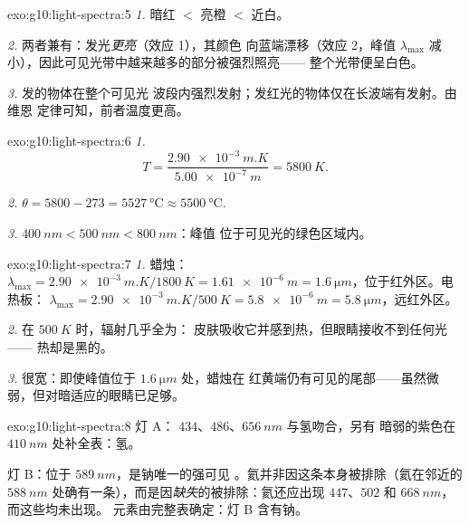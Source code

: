 \begin{solution}{exo:g10:light-spectra:5}
\emph{1.} 暗红 $<$ 亮橙 $<$ 近白。

\emph{2.} 两者兼有：发光\emph{更亮}（效应 1），其颜色
向蓝端漂移（效应 2，峰值 $\lambda_{\max}$
减小），因此可见光带中越来越多的部分被强烈照亮——
整个光带便呈白色。

\emph{3.} 发的物体在整个可见光
波段内强烈发射；发红光的物体仅在长波端有发射。由维恩
定律可知，前者温度更高。
\end{solution}

\begin{solution}{exo:g10:light-spectra:6}
\emph{1.}
\[
T = \frac{\qty{2.90e-3}{m.K}}{\qty{5.00e-7}{m}} = \qty{5800}{K}.
\]

\emph{2.} $\theta = 5800 - 273 = \qty{5527}{\degreeCelsius} \approx
\qty{5500}{\degreeCelsius}$.

\emph{3.} $\qty{400}{nm} < \qty{500}{nm} < \qty{800}{nm}$：峰值
位于可见光的绿色区域内。
\end{solution}

\begin{solution}{exo:g10:light-spectra:7}
\emph{1.} 蜡烛：
$\lambda_{\max} = \qty{2.90e-3}{m.K} / \qty{1800}{K} = \qty{1.61e-6}{m}
= \qty{1.6}{\micro m}$，位于红外区。电热板：
$\lambda_{\max} = \qty{2.90e-3}{m.K} / \qty{500}{K} = \qty{5.8e-6}{m}
= \qty{5.8}{\micro m}$，远红外区。

\emph{2.} 在 $\qty{500}{K}$ 时，辐射几乎全为：
皮肤吸收它并感到热，但眼睛接收不到任何光——
热却是黑的。

\emph{3.} 很宽：即使峰值位于
$\qty{1.6}{\micro m}$ 处，蜡烛在
红黄端仍有可见的尾部——虽然微弱，但对暗适应的眼睛已足够。
\end{solution}

\begin{solution}{exo:g10:light-spectra:8}
灯 A： $434$、$486$、$\qty{656}{nm}$ 与氢吻合，另有
暗弱的紫色在 $\qty{410}{nm}$ 处补全表：氢。

灯 B：位于 $\qty{589}{nm}$，是钠唯一的强可见
。氦并非因这条本身被排除（氦在邻近的
$\qty{588}{nm}$ 处确有一条），而是因\emph{缺失}的被排除：氦还应出现
$447$、$502$ 和 $\qty{668}{nm}$，而这些均未出现。
元素由完整表确定：灯 B 含有钠。
\end{solution}

